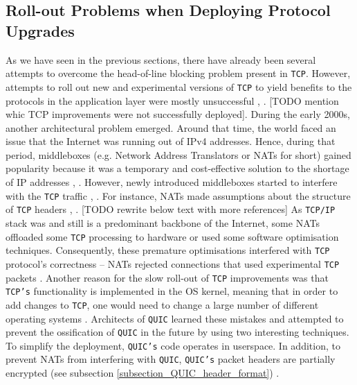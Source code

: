 \documentclass[12pt,a4paper,twoside,openright]{report}
\begin{document}
\subsection{Roll-out Problems when Deploying Protocol Upgrades}
As we have seen in the previous sections, there have already been several attempts to overcome the head-of-line blocking problem present in \texttt{TCP}.
However, attempts to roll out new and experimental versions of \texttt{TCP} to yield benefits to the protocols in the application layer were mostly unsuccessful \cite{bib_Netdev_0x13_QUIC_Tutorial}, \cite{PollardBarry2019HiAP}.
[TODO mention whic TCP improvements were not successfully deployed].
During the early 2000s, another architectural problem emerged.
Around that time, the world faced an issue that the Internet was running out of IPv4 addresses.
Hence, during that period, middleboxes (e.g. Network Address Translators or NATs for short) gained popularity because it was a temporary and cost-effective solution to the shortage of IP addresses \cite{MurphyNiallRichard2005Ina}, \cite{bib_Netdev_0x13_QUIC_Tutorial}.
However, newly introduced middleboxes started to interfere with the \texttt{TCP} traffic \cite{bib_Netdev_0x13_QUIC_Tutorial}, \cite{PollardBarry2019HiAP}.
For instance, NATs made assumptions about the structure of \texttt{TCP} headers \cite{bib_Netdev_0x13_QUIC_Tutorial}, \cite{PollardBarry2019HiAP}.
[TODO rewrite below text with more references]
As \texttt{TCP/IP} stack was and still is a predominant backbone of the Internet, some NATs offloaded some \texttt{TCP} processing to hardware or used some software optimisation techniques.
Consequently, these premature optimisations interfered with \texttt{TCP} protocol's correctness -- NATs rejected connections that used experimental \texttt{TCP} packets \cite{PollardBarry2019HiAP}.
Another reason for the slow roll-out of \texttt{TCP} improvements was that \texttt{TCP's} functionality is implemented in the OS kernel, meaning that in order to add changes to \texttt{TCP}, one would need to change a large number of different operating systems  \cite{PollardBarry2019HiAP}.
Architects of \texttt{QUIC} learned these mistakes and attempted to prevent the ossification of \texttt{QUIC} in the future by using two interesting techniques.
To simplify the deployment, \texttt{QUIC's} code operates in userspace.
In addition, to prevent NATs from interfering with \texttt{QUIC}, \texttt{QUIC's} packet headers are partially encrypted (see subsection \ref{subsection_QUIC_header_format}) \cite{bib_Netdev_0x13_QUIC_Tutorial}.
\end{document}

